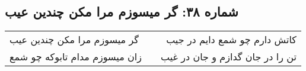 \begin{center}
\section*{شماره ۳۸: گر میسوزم مرا مکن چندین عیب}
\label{sec:038}
\begin{longtable}{l p{0.5cm} r}
گر میسوزم مرا مکن چندین عیب
&&
کاتش دارم چو شمع دایم در جیب
\\
زان میسوزم مدام تابوکه چو شمع
&&
تن را در جان گدازم و جان در غیب
\\
\end{longtable}
\end{center}
